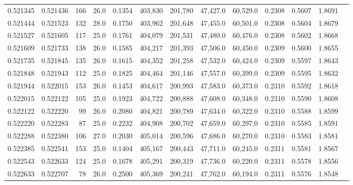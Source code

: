 \begin{tabular}{rrrrrrrrrrrrr}
0.521345 & 0.521436 &   166 & 26.0 &                                     0.1354 & 403,830 & 201,780 &  47,427.0 &  60,529.0 & 0.2308 & 0.5607 & 1.8691 \\
0.521444 & 0.521523 &   132 & 28.0 &                                     0.1750 & 403,962 & 201,648 &  47,455.0 &  60,501.0 & 0.2308 & 0.5604 & 1.8679 \\
0.521527 & 0.521605 &   117 & 25.0 &                                     0.1761 & 404,079 & 201,531 &  47,480.0 &  60,476.0 & 0.2308 & 0.5602 & 1.8668 \\
0.521609 & 0.521733 &   138 & 26.0 &                                     0.1585 & 404,217 & 201,393 &  47,506.0 &  60,450.0 & 0.2309 & 0.5600 & 1.8655 \\
0.521735 & 0.521845 &   135 & 26.0 &                                     0.1615 & 404,352 & 201,258 &  47,532.0 &  60,424.0 & 0.2309 & 0.5597 & 1.8643 \\
0.521848 & 0.521943 &   112 & 25.0 &                                     0.1825 & 404,464 & 201,146 &  47,557.0 &  60,399.0 & 0.2309 & 0.5595 & 1.8632 \\
0.521944 & 0.522015 &   153 & 26.0 &                                     0.1453 & 404,617 & 200,993 &  47,583.0 &  60,373.0 & 0.2310 & 0.5592 & 1.8618 \\
0.522015 & 0.522122 &   105 & 25.0 &                                     0.1923 & 404,722 & 200,888 &  47,608.0 &  60,348.0 & 0.2310 & 0.5590 & 1.8608 \\
0.522122 & 0.522220 &    99 & 26.0 &                                     0.2080 & 404,821 & 200,789 &  47,634.0 &  60,322.0 & 0.2310 & 0.5588 & 1.8599 \\
0.522220 & 0.522283 &    87 & 25.0 &                                     0.2232 & 404,908 & 200,702 &  47,659.0 &  60,297.0 & 0.2310 & 0.5585 & 1.8591 \\
0.522288 & 0.522380 &   106 & 27.0 &                                     0.2030 & 405,014 & 200,596 &  47,686.0 &  60,270.0 & 0.2310 & 0.5583 & 1.8581 \\
0.522385 & 0.522541 &   153 & 25.0 &                                     0.1404 & 405,167 & 200,443 &  47,711.0 &  60,245.0 & 0.2311 & 0.5581 & 1.8567 \\
0.522543 & 0.522633 &   124 & 25.0 &                                     0.1678 & 405,291 & 200,319 &  47,736.0 &  60,220.0 & 0.2311 & 0.5578 & 1.8556 \\
0.522633 & 0.522707 &    78 & 26.0 &                                     0.2500 & 405,369 & 200,241 &  47,762.0 &  60,194.0 & 0.2311 & 0.5576 & 1.8548 \\

\end{tabular}
